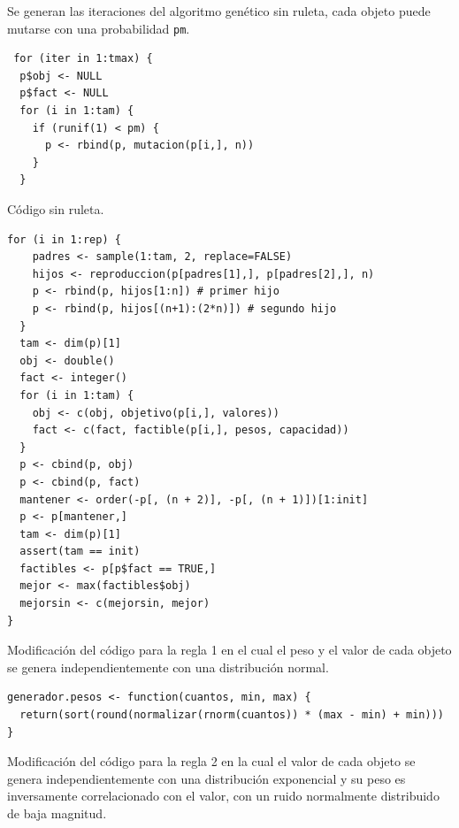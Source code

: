 \documentclass[12pt]{amsart}
\begin{document}
\newpage
Se generan las iteraciones del algoritmo genético sin ruleta, cada objeto puede mutarse con una probabilidad \texttt{pm}.
\renewcommand{\listingscaption}{Código}
\begin{listing}[H]
  \begin{verbatim}
 for (iter in 1:tmax) {
  p$obj <- NULL
  p$fact <- NULL
  for (i in 1:tam) { 
    if (runif(1) < pm) {
      p <- rbind(p, mutacion(p[i,], n))
    }
  }
  \end{verbatim}
  \label{codigo1}
\end{listing}

Código sin ruleta.
\renewcommand{\listingscaption}{Código}
\begin{listing}[H]
  \begin{verbatim}
for (i in 1:rep) { 
    padres <- sample(1:tam, 2, replace=FALSE)
    hijos <- reproduccion(p[padres[1],], p[padres[2],], n)
    p <- rbind(p, hijos[1:n]) # primer hijo
    p <- rbind(p, hijos[(n+1):(2*n)]) # segundo hijo
  }
  tam <- dim(p)[1]
  obj <- double()
  fact <- integer()
  for (i in 1:tam) {
    obj <- c(obj, objetivo(p[i,], valores))
    fact <- c(fact, factible(p[i,], pesos, capacidad))
  }
  p <- cbind(p, obj)
  p <- cbind(p, fact)
  mantener <- order(-p[, (n + 2)], -p[, (n + 1)])[1:init]
  p <- p[mantener,]
  tam <- dim(p)[1]
  assert(tam == init)
  factibles <- p[p$fact == TRUE,]
  mejor <- max(factibles$obj)
  mejorsin <- c(mejorsin, mejor)
}
  \end{verbatim}
  \label{codigo1}
\end{listing}

Modificación del código para la regla 1 en el cual el peso y el valor de cada objeto se genera independientemente con una distribución normal.

\renewcommand{\listingscaption}{Código}
\begin{listing}[H]
  \begin{verbatim}
generador.pesos <- function(cuantos, min, max) {
  return(sort(round(normalizar(rnorm(cuantos)) * (max - min) + min)))
}
  \end{verbatim}
  \label{codigo1}
\end{listing}

\newpage
Modificación del código para la regla 2 en la cual el valor de cada objeto se genera independientemente con una distribución exponencial y su peso es inversamente correlacionado con el valor, con un ruido normalmente distribuido de baja magnitud.
\end{document}
